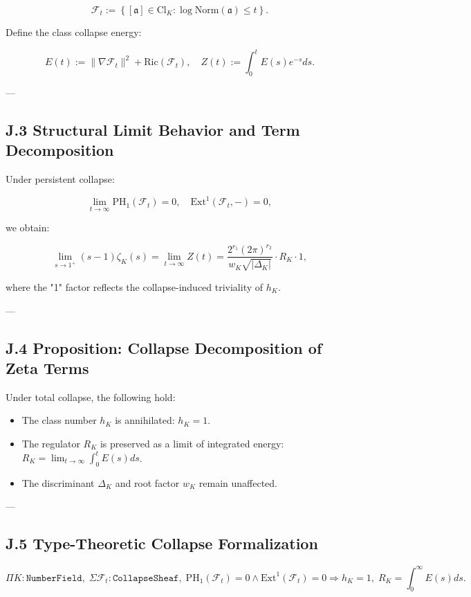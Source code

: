 \documentclass[11pt]{article}
\begin{document}
\[
\mathcal{F}_t := \left\{ [\mathfrak{a}] \in \mathrm{Cl}_K : \log \mathrm{Norm}(\mathfrak{a}) \leq t \right\}.
\]

Define the class collapse energy:

\[
E(t) := \|\nabla \mathcal{F}_t\|^2 + \mathrm{Ric}(\mathcal{F}_t),
\quad
Z(t) := \int_0^t E(s)e^{-s} ds.
\]

---

\subsection*{J.3 Structural Limit Behavior and Term Decomposition}

Under persistent collapse:

\[
\lim_{t \to \infty} \mathrm{PH}_1(\mathcal{F}_t) = 0, \quad \mathrm{Ext}^1(\mathcal{F}_t, -) = 0,
\]

we obtain:

\[
\lim_{s \to 1^+} (s - 1) \zeta_K(s) = \lim_{t \to \infty} Z(t) = \frac{2^{r_1}(2\pi)^{r_2}}{w_K \sqrt{|\Delta_K|}} \cdot R_K \cdot 1,
\]

where the "1" factor reflects the collapse-induced triviality of $h_K$.

---

\subsection*{J.4 Proposition: Collapse Decomposition of Zeta Terms}

\begin{proposition}
Under total collapse, the following hold:
\begin{itemize}
  \item The class number $h_K$ is annihilated: $h_K = 1$.
  \item The regulator $R_K$ is preserved as a limit of integrated energy: $R_K = \lim_{t \to \infty} \int_0^t E(s) ds$.
  \item The discriminant $\Delta_K$ and root factor $w_K$ remain unaffected.
\end{itemize}
\end{proposition}

---

\subsection*{J.5 Type-Theoretic Collapse Formalization}

\[
\Pi K : \texttt{NumberField},\;
\Sigma \mathcal{F}_t : \texttt{CollapseSheaf},\;
\mathrm{PH}_1(\mathcal{F}_t) = 0 \wedge \mathrm{Ext}^1(\mathcal{F}_t) = 0
\Rightarrow
h_K = 1, \;
R_K = \int_0^\infty E(s) ds.
\]
\end{document}
